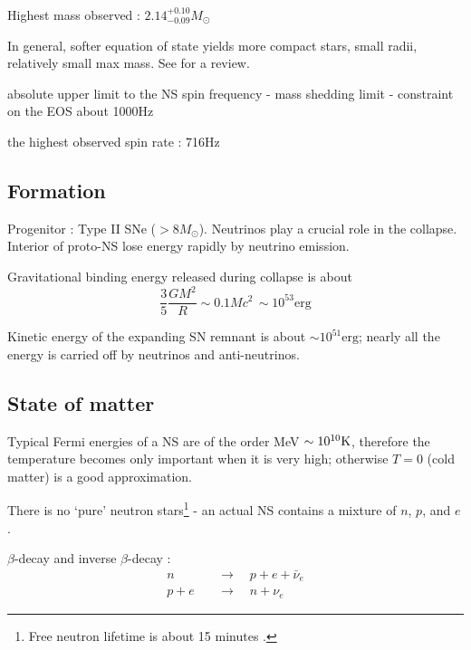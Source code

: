 \documentclass[11pt, oneside]{article}
\newcommand{\solarmass}{M_\odot}
\begin{document}
Highest mass observed : $2.14^{+0.10}_{-0.09}\solarmass$ \citep{NANOGrav2019}

In general, softer equation of state yields more compact stars, small radii,
relatively small max mass. See \cite{Ozel2016} for a review.

absolute upper limit to the NS spin frequency 
- mass shedding limit - constraint on the EOS 
about 1000Hz

the highest observed spin rate  : 716Hz \citep{Hessels2006}


\subsection{Formation}

Progenitor : Type II SNe ($ > 8 \solarmass$). Neutrinos play a crucial role in
the collapse. Interior of proto-NS lose energy rapidly by neutrino emission.

Gravitational binding energy released during collapse is about 
\begin{equation}
    \frac{3}{5}\frac{GM^2}{R} \sim 0.1 Mc^2
    \, \sim 10^{53}\text{erg}
\end{equation}

Kinetic energy of the expanding SN remnant is about $\sim 10^{51}\text{erg}$;
nearly all the energy is carried off by neutrinos and anti-neutrinos.


\subsection{State of matter}

Typical Fermi energies of a NS are of the order MeV $\sim
10^{10}\si[]{\kelvin}$, therefore the temperature becomes only important when it
is very high; otherwise $T=0$ (cold matter) is a good approximation.

There is no `pure' neutron stars\footnote{Free neutron lifetime is about 15
minutes \citep{UCNtau2021}.} - an actual NS contains a mixture of $n$, $p$,
and $e$.

$\beta$-decay and inverse $\beta$-decay : 
\begin{align}
    \label{eq:beta decay}
    n &\quad\rightarrow\quad p + e + \bar{\nu}_e \\
    \label{eq:inverse beta decay} p + e & \quad\rightarrow\quad n + \nu_e
\end{align}
\end{document}
